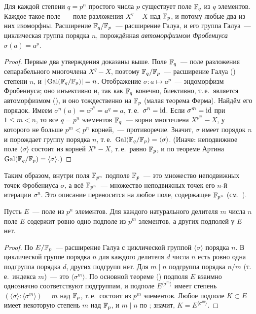 \begin{proposition}[4.20]
Для каждой степени $q=p^n$ простого числа $p$ существует поле $\mathbb F_q$ из $q$ элементов. Каждое такое поле~--- поле
разложения $X^q-X$ над $\mathbb F_p$, и потому любые два из них изоморфны. Расширение $\mathbb F_q/\mathbb F_p$~--- расширение Галуа, и его
группа Галуа~--- циклическая группа порядка $n$, порождённая \emph{автоморфизмом Фробениуса} $\sigma(a)=a^p$.
\end{proposition}

\begin{proof}
Первые два утверждения доказаны выше. Поле $\mathbb F_q$~--- поле разложения сепарабельного многочлена $X^q-X$, поэтому
$\mathbb F_q/\mathbb F_p$~--- расширение Галуа () степени $n$, и $|\operatorname{Gal}(\mathbb F_q/\mathbb F_p)|=n$. Отображение $\sigma\colon a\mapsto a^p$~---
эндоморфизм Фробениуса; оно инъективно и, так как $\mathbb F_q$ конечно, биективно, т.\,е.\ является автоморфизмом (), и оно
тождественно на $\mathbb F_p$ (малая теорема Ферма). Найдём его порядок. Имеем $\sigma^n(a)=a^{p^n}=a^q=a$, т.\,е.\ $\sigma^n=\operatorname{id}$. Если
$\sigma^m=\operatorname{id}$ при $1\le m<n$, то все $q=p^n$ элементов $\mathbb F_q$~--- корни многочлена $X^{p^m}-X$, у которого не больше
$p^m<p^n$ корней,~--- противоречие. Значит, $\sigma$ имеет порядок $n$ и порождает группу порядка $n$, т.\,е.\
$\operatorname{Gal}(\mathbb F_q/\mathbb F_p)=\langle\sigma\rangle$. (Иначе: неподвижное поле $\langle\sigma\rangle$ состоит из корней $X^p-X$, т.\,е.\ равно
$\mathbb F_p$, и по теореме Артина \rf{3.11} $\operatorname{Gal}(\mathbb F_q/\mathbb F_p)=\langle\sigma\rangle$.)
\end{proof}

Таким образом, внутри поля $\mathbb F_{p^n}$ подполе $\mathbb F_p$~--- это множество неподвижных точек Фробениуса $\sigma$, а всё $\mathbb F_{p^n}$~---
множество неподвижных точек его $n$-й итерации $\sigma^n$. Это описание переносится на любое поле, содержащее
$\mathbb F_{p^n}$ (см.\ \rf{4.23}).

\begin{corollary}[4.21]
Пусть $E$~--- поле из $p^n$ элементов. Для каждого натурального делителя $m$ числа $n$ поле $E$ содержит ровно одно
подполе из $p^m$ элементов, а других подполей у $E$ нет.
\end{corollary}

\begin{proof}
По  $E/\mathbb F_p$~--- расширение Галуа с циклической группой $\langle\sigma\rangle$ порядка $n$. В циклической группе порядка
$n$ для каждого делителя $d$ числа $n$ есть ровно одна подгруппа порядка $d$, других подгрупп нет. Для $m\mid n$
подгруппа порядка $n/m$ (т.\,е.\ индекса $m$)~--- это $\langle\sigma^m\rangle$. По основной теореме (\rf{3.17}) подполя $E$
взаимно однозначно соответствуют подгруппам, и подполе $E^{\langle\sigma^m\rangle}$ имеет степень $(\langle\sigma\rangle:\langle\sigma^m\rangle)=m$ над
$\mathbb F_p$, т.\,е.\ состоит из $p^m$ элементов. Любое подполе $K\subset E$ имеет некоторую степень $m$ над $\mathbb F_p$, и
$m\mid n$ по \rf{1.20}; значит, $K=E^{\langle\sigma^m\rangle}$.
\end{proof}

